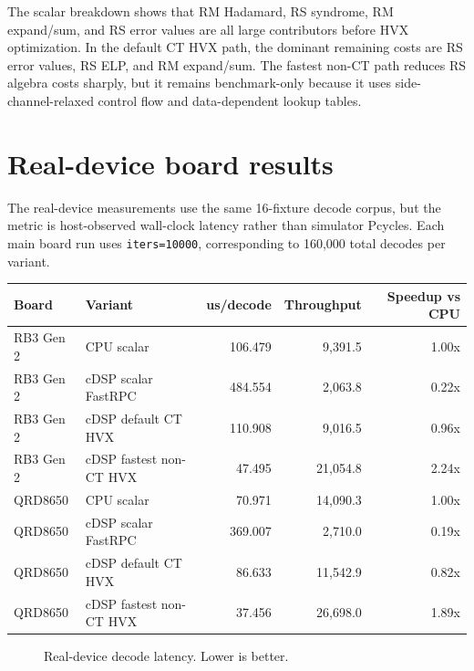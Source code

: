 \documentclass[12pt,a4paper]{article}
\begin{document}
The scalar breakdown shows that RM Hadamard, RS syndrome, RM expand/sum, and RS error values are all large contributors before HVX optimization.  In the default CT HVX path, the dominant remaining costs are RS error values, RS ELP, and RM expand/sum.  The fastest non-CT path reduces RS algebra costs sharply, but it remains benchmark-only because it uses side-channel-relaxed control flow and data-dependent lookup tables.

\section{Real-device board results}

The real-device measurements use the same 16-fixture decode corpus, but the metric is host-observed wall-clock latency rather than simulator Pcycles. Each main board run uses \texttt{iters=10000}, corresponding to 160,000 total decodes per variant.

\begin{center}
\begin{tabular}{llrrr}
\toprule
Board & Variant & us/decode & Throughput & Speedup vs CPU \\
\midrule
RB3 Gen 2 & CPU scalar & 106.479 & 9,391.5 & 1.00x \\
RB3 Gen 2 & cDSP scalar FastRPC & 484.554 & 2,063.8 & 0.22x \\
RB3 Gen 2 & cDSP default CT HVX & 110.908 & 9,016.5 & 0.96x \\
RB3 Gen 2 & cDSP fastest non-CT HVX & 47.495 & 21,054.8 & 2.24x \\
QRD8650 & CPU scalar & 70.971 & 14,090.3 & 1.00x \\
QRD8650 & cDSP scalar FastRPC & 369.007 & 2,710.0 & 0.19x \\
QRD8650 & cDSP default CT HVX & 86.633 & 11,542.9 & 0.82x \\
QRD8650 & cDSP fastest non-CT HVX & 37.456 & 26,698.0 & 1.89x \\
\bottomrule
\end{tabular}
\end{center}

\begin{figure}[htbp]
\centering
{}
\caption{Real-device decode latency. Lower is better.}
\end{figure}
\end{document}
